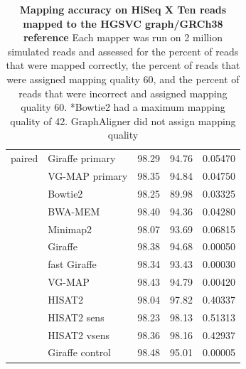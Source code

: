 \documentclass[11pt]{ucscthesis}
\begin{document}
\begin{table}[p]
\begin{tabular}{|l|l|r|r|r|}
        \hline
        paired  & Giraffe primary	& 98.29     & 94.76     & 0.05470 \\
                & VG-MAP primary   	& 98.35     & 94.84     & 0.04750 \\
                & Bowtie2       	& 98.25     & 89.98     & 0.03325 \\
                & BWA-MEM        	& 98.40     & 94.36     & 0.04280 \\
                & Minimap2      	& 98.07     & 93.69     & 0.06815 \\
                & Giraffe	        & 98.38     & 94.68     & 0.00050 \\
                & fast Giraffe	    & 98.34     & 93.43     & 0.00030 \\
                & VG-MAP           	& 98.43     & 94.79     & 0.00420 \\
                & HISAT2	        & 98.04     & 97.82     & 0.40337 \\
                & HISAT2 sens   	& 98.23     & 98.13     & 0.51313 \\
                & HISAT2 vsens	    & 98.36     & 98.16     & 0.42937 \\
                & Giraffe control	& 98.48     & 95.01     & 0.00005 \\
        \hline
        
    \end{tabular}
    \caption[Mapping accuracy on HiSeq X Ten reads mapped to the HGSVC graph/GRCh38 reference]{\textbf{Mapping accuracy on HiSeq X Ten reads mapped to the HGSVC graph/GRCh38 reference} Each mapper was run on 2 million simulated reads and assessed for the percent of reads that were mapped correctly, the percent of reads that were assigned mapping quality 60, and the percent of reads that were incorrect and assigned mapping quality 60. *Bowtie2 had a maximum mapping quality of 42. GraphAligner did not assign mapping quality}
    \label{tab:mapping_accuracy_hgsvc_hiseqxten}
\end{table}
\end{document}

